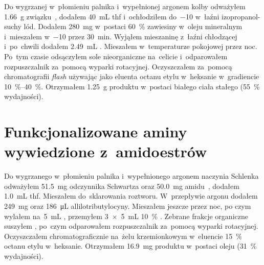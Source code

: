 Do wygrzanej w~płomieniu palnika i~wypełnionej argonem kolby odważyłem \SI{1.66}{\gram}
  związku~, dodałem \SI{40}{\mL} \gls{thf}
  i~ochłodziłem do~\SI{-10}{\degC} w~łaźni izopropanol-suchy lód.
Dodałem \SI{280}{\mg}  w~postaci \SI{60}{\percent} zawiesiny w~oleju mineralnym
  i~mieszałem w~\SI{-10}{\degC} przez \SI{30}{\minute}.
Wyjąłem mieszaninę z~łaźni chłodzącej i~po~chwili dodałem \SI{2.49}{\mL} .
Mieszałem w~temperaturze pokojowej przez noc.
Po~tym czasie odsączyłem sole nieorganiczne na~celicie i~odparowałem rozpuszczalnik za~pomocą
  wyparki rotacyjnej.
Oczyszczałem za~pomocą chromatografii \textit{flash} używając jako eluenta octanu etylu w~heksanie
  w~gradiencie \SIrange{10}{40}{\percent}.
Otrzymałem \SI{1.25}{\gram} produktu w~postaci białego ciała stałego (\SI{55}{\percent} wydajności).




\section{Funkcjonalizowane aminy wywiedzione z~amidoestrów}\label{experimental:amidoester-products}
Do wygrzanego w~płomieniu palnika i~wypełnionego argonem naczynia Schlenka odważyłem
  \SI{51.5}{\mg} odczynnika Schwartza oraz \SI{50.0}{\mg} amidu~,
  dodałem \SI{1.0}{\mL} \gls{thf}.
Mieszałem do~sklarowania roztworu.
W~przepływie argonu dodałem \SI{249}{\mg}  oraz \SI{186}{\uL} allilotributylocyny.
Mieszałem jeszcze przez noc, po czym wylałem na~\SI{5}{\mL} ,
  przemyłem \SI[product-units = single]{3 x 5}{\mL} \SI{10}{\percent} .
Zebrane frakcje organiczne suszyłem , po~czym odparowałem rozpuszczalnik za~pomocą
  wyparki rotacyjnej.
Oczyszczałem chromatograficznie na~żelu krzemionkowym w~eluencie \SI{15}{\percent} octanu
  etylu w~heksanie.
Otrzymałem \SI{16.9}{\mg} produktu w~postaci oleju (\SI{31}{\percent} wydajności).

